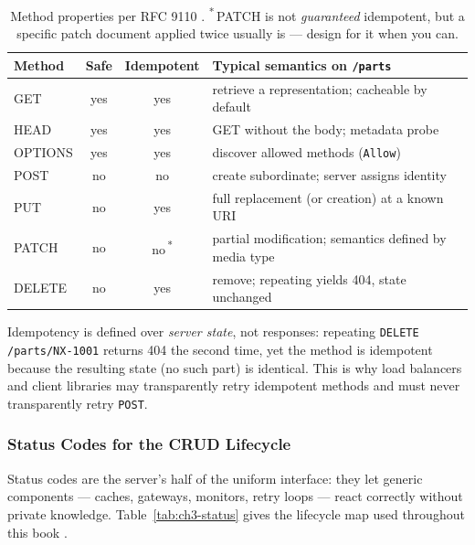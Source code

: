 \begin{table}[h]
  \centering
  \small
  \begin{tabularx}{\textwidth}{l c c X}
    \toprule
    \textbf{Method} & \textbf{Safe} & \textbf{Idempotent} & \textbf{Typical semantics on \texttt{/parts}} \\
    \midrule
    GET     & yes & yes & retrieve a representation; cacheable by default \\
    HEAD    & yes & yes & GET without the body; metadata probe \\
    OPTIONS & yes & yes & discover allowed methods (\texttt{Allow}) \\
    POST    & no  & no  & create subordinate; server assigns identity \\
    PUT     & no  & yes & full replacement (or creation) at a known URI \\
    PATCH   & no  & no\,\textsuperscript{*} & partial modification; semantics defined by media type \\
    DELETE  & no  & yes & remove; repeating yields 404, state unchanged \\
    \bottomrule
  \end{tabularx}
  \caption{Method properties per RFC 9110 \cite{rfc9110}.
  \textsuperscript{*}\,PATCH is not \emph{guaranteed} idempotent, but a specific
  patch document applied twice usually is --- design for it when you can.}
  \label{tab:ch3-methods}
\end{table}

Idempotency is defined over \emph{server state}, not responses: repeating
\texttt{DELETE /parts/NX-1001} returns 404 the second time, yet the method is
idempotent because the resulting state (no such part) is identical. This is why
load balancers and client libraries may transparently retry idempotent methods
and must never transparently retry \texttt{POST}.

\subsubsection{Status Codes for the CRUD Lifecycle}

Status codes are the server's half of the uniform interface: they let generic
components --- caches, gateways, monitors, retry loops --- react correctly
without private knowledge. Table~\ref{tab:ch3-status} gives the lifecycle map
used throughout this book \cite{rfc9110}.

